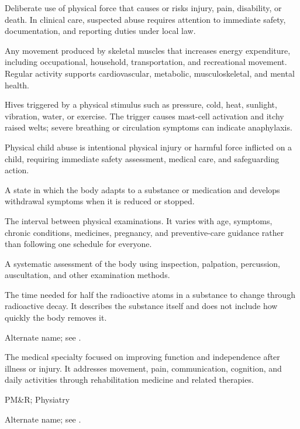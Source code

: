  Deliberate use of physical force that causes or risks injury, pain, disability, or death. In clinical care, suspected abuse requires attention to immediate safety, documentation, and reporting duties under local law.

 Any movement produced by skeletal muscles that increases energy expenditure, including occupational, household, transportation, and recreational movement. Regular activity supports cardiovascular, metabolic, musculoskeletal, and mental health.

 Hives triggered by a physical stimulus such as pressure, cold, heat, sunlight, vibration, water, or exercise. The trigger causes mast-cell activation and itchy raised welts; severe breathing or circulation symptoms can indicate anaphylaxis.

 Physical child abuse is intentional physical injury or harmful force inflicted on a child, requiring immediate safety assessment, medical care, and safeguarding action.

 A state in which the body adapts to a substance or medication and develops withdrawal symptoms when it is reduced or stopped.

 The interval between physical examinations. It varies with age, symptoms, chronic conditions, medicines, pregnancy, and preventive-care guidance rather than following one schedule for everyone.

 A systematic assessment of the body using inspection, palpation, percussion, auscultation, and other examination methods.

 The time needed for half the radioactive atoms in a substance to change through radioactive decay. It describes the substance itself and does not include how quickly the body removes it.

 Alternate name; see .

 The medical specialty focused on improving function and independence after illness or injury. It addresses movement, pain, communication, cognition, and daily activities through rehabilitation medicine and related therapies.

\synonyms
PM\&R; Physiatry

 Alternate name; see .


